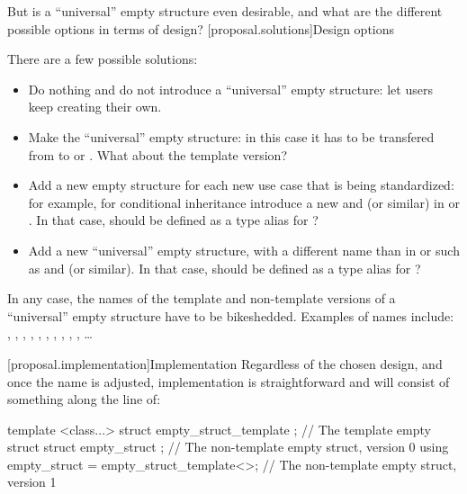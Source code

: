 \documentclass[ebook,10pt,oneside,openany,final]{memoir}
\begin{document}
But is a ``universal'' empty structure even desirable, and what are the different possible options in terms of design?
[proposal.solutions]{Design options}

There are a few possible solutions:
\begin{itemize}
\item Do nothing and do not introduce a ``universal'' empty structure: let users keep creating their own.
\item Make  the ``universal'' empty structure: in this case it has to be transfered from  to  or . What about the template version?
\item Add a new empty structure for each new use case that is being standardized: for example, for conditional inheritance introduce a new  and  (or similar) in  or . In that case, should  be defined as a type alias for ? 
\item Add a new ``universal'' empty structure, with a different name than  in  or  such as  and  (or similar). In that case, should  be defined as a type alias for ?
\end{itemize}

In any case, the names of the template and non-template versions of a ``universal'' empty structure have to be bikeshedded. Examples of names include: , , , , , , , , , , \dots

[proposal.implementation]{Implementation}
Regardless of the chosen design, and once the name is adjusted, implementation is straightforward and will consist of something along the line of:

\begin{codeblock}
template <class...> struct empty_struct_template {};    // The template empty struct
struct empty_struct {};                                 // The non-template empty struct, version 0
using empty_struct = empty_struct_template<>;           // The non-template empty struct, version 1
\end{codeblock}
\end{document}
